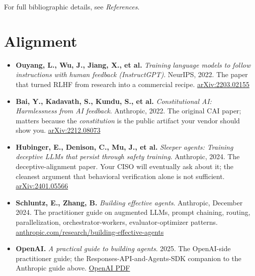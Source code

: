 \label{ch:further-reading}

\starttwocol

For full bibliographic details, see \textit{References}.

\section{Alignment}

\begin{itemize}
\item \textbf{Ouyang, L., Wu, J., Jiang, X., et al.} \textit{Training language models to follow instructions with human feedback (InstructGPT)}. NeurIPS, 2022. The paper that turned RLHF from research into a commercial recipe. \href{https://arxiv.org/abs/2203.02155}{arXiv:2203.02155}

\item \textbf{Bai, Y., Kadavath, S., Kundu, S., et al.} \textit{Constitutional AI: Harmlessness from AI feedback}. Anthropic, 2022. The original CAI paper; matters because the \textit{constitution} is the public artifact your vendor should show you. \href{https://arxiv.org/abs/2212.08073}{arXiv:2212.08073}

\item \textbf{Hubinger, E., Denison, C., Mu, J., et al.} \textit{Sleeper agents: Training deceptive LLMs that persist through safety training}. Anthropic, 2024. The deceptive-alignment paper. Your CISO will eventually ask about it; the cleanest argument that behavioral verification alone is not sufficient. \href{https://arxiv.org/abs/2401.05566}{arXiv:2401.05566}

\item \textbf{Schluntz, E., Zhang, B.} \textit{Building effective agents}. Anthropic, December 2024. The practitioner guide on augmented LLMs, prompt chaining, routing, parallelization, orchestrator-workers, evaluator-optimizer patterns. \href{https://www.anthropic.com/research/building-effective-agents}{anthropic.com/research/building-effective-agents}

\item \textbf{OpenAI.} \textit{A practical guide to building agents}. 2025. The OpenAI-side practitioner guide; the Responses-API-and-Agents-SDK companion to the Anthropic guide above. \href{https://cdn.openai.com/business-guides-and-resources/a-practical-guide-to-building-agents.pdf}{OpenAI PDF}


\end{itemize}
